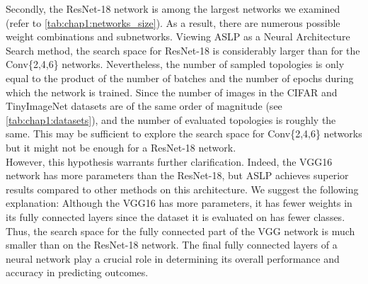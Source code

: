Secondly, the ResNet-18 network is among the largest networks we examined (refer
to \cref{tab:chap1:networks_size}). As a result, there are numerous possible
weight combinations and subnetworks. Viewing \ac{ASLP} as a Neural Architecture
Search method, the search space for ResNet-18 is considerably larger than for
the Conv\{2,4,6\} networks. Nevertheless, the number of sampled topologies is only
equal to the product of the number of batches and the number of epochs during
which the network is trained. Since the number of images in the CIFAR and
TinyImageNet datasets are of the same order of magnitude (see
\cref{tab:chap1:datasets}), and the number of evaluated topologies is roughly the
same. This may be sufficient to explore the search space for Conv\{2,4,6\}
networks but it might not be enough for a ResNet-18 network.\\

However, this hypothesis warrants further clarification. Indeed, the VGG16
network has more parameters than the ResNet-18, but \ac{ASLP} achieves superior
results compared to other methods on this architecture. We suggest the following
explanation: Although the VGG16 has more parameters, it has fewer weights in its
fully connected layers since the dataset it is evaluated on has fewer classes.
Thus, the search space for the fully connected part of the VGG network is much
smaller than on the ResNet-18 network. The final fully connected layers of a
neural network play a crucial role in determining its overall performance and
accuracy in predicting outcomes.\\





